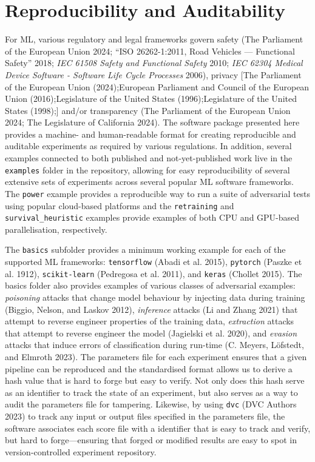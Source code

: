 \documentclass[
]{article}
\begin{document}
\hypertarget{reproducibility-and-auditability}{%
\section{Reproducibility and
Auditability}\label{reproducibility-and-auditability}}

For ML, various regulatory and legal frameworks govern safety (The
Parliament of the European Union 2024; {``{ISO} 26262-1:2011, Road
Vehicles --- Functional Safety''} 2018; \emph{IEC 61508 Safety and
Functional Safety} 2010; \emph{IEC 62304 Medical Device Software -
Software Life Cycle Processes} 2006), privacy {[}The Parliament of the
European Union (2024);European Parliament and Council of the European
Union (2016);Legislature of the United States (1996);Legislature of the
United States (1998);{]} and/or transparency (The Parliament of the
European Union 2024; The Legislature of California 2024). The software
package presented here provides a machine- and human-readable format for
creating reproducible and auditable experiments as required by various
regulations. In addition, several examples connected to both published
and not-yet-published work live in the \texttt{examples} folder in the
repository, allowing for easy reproducibility of several extensive sets
of experiments across several popular ML software frameworks. The
\texttt{power} example provides a reproducible way to run a suite of
adversarial tests using popular cloud-based platforms and the
\texttt{retraining} and \texttt{survival\_heuristic} examples provide
examples of both CPU and GPU-based parallelisation, respectively.

The \texttt{basics} subfolder provides a minimum working example for
each of the supported ML frameworks: \texttt{tensorflow} (Abadi et al.
2015), \texttt{pytorch} (Paszke et al. 1912), \texttt{scikit-learn}
(Pedregosa et al. 2011), and \texttt{keras} (Chollet 2015). The basics
folder also provides examples of various classes of adversarial
examples: \emph{poisoning} attacks that change model behaviour by
injecting data during training (Biggio, Nelson, and Laskov 2012),
\emph{inference} attacks (Li and Zhang 2021) that attempt to reverse
engineer properties of the training data, \emph{extraction} attacks that
attempt to reverse engineer the model (Jagielski et al. 2020), and
\emph{evasion} attacks that induce errors of classification during
run-time (C. Meyers, Löfstedt, and Elmroth 2023). The parameters file
for each experiment ensures that a given pipeline can be reproduced and
the standardised format allows us to derive a hash value that is hard to
forge but easy to verify. Not only does this hash serve as an identifier
to track the state of an experiment, but also serves as a way to audit
the parameters file for tampering. Likewise, by using \texttt{dvc} (DVC
Authors 2023) to track any input or output files specified in the
parameters file, the software associates each score file with a
identifier that is easy to track and verify, but hard to
forge---ensuring that forged or modified results are easy to spot in
version-controlled experiment repository.
\end{document}

